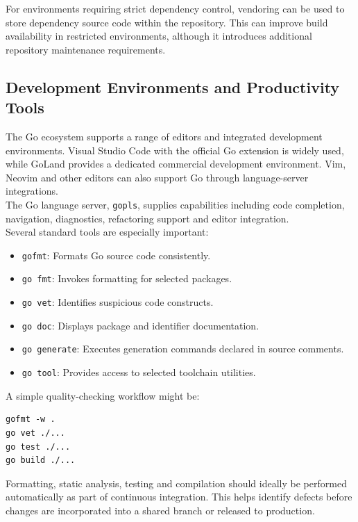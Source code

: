 For environments requiring strict dependency control, vendoring can be used to store dependency source code within the repository. This can improve build availability in restricted environments, although it introduces additional repository maintenance requirements.\\

\subsection{Development Environments and Productivity Tools}

The Go ecosystem supports a range of editors and integrated development environments. Visual Studio Code with the official Go extension is widely used, while GoLand provides a dedicated commercial development environment. Vim, Neovim and other editors can also support Go through language-server integrations.\\

The Go language server, \texttt{gopls}, supplies capabilities including code completion, navigation, diagnostics, refactoring support and editor integration.\\

Several standard tools are especially important:

\begin{itemize}
    \item \texttt{gofmt}: Formats Go source code consistently.
    \item \texttt{go fmt}: Invokes formatting for selected packages.
    \item \texttt{go vet}: Identifies suspicious code constructs.
    \item \texttt{go doc}: Displays package and identifier documentation.
    \item \texttt{go generate}: Executes generation commands declared in source comments.
    \item \texttt{go tool}: Provides access to selected toolchain utilities.
\end{itemize}

A simple quality-checking workflow might be:

\begin{lstlisting}
gofmt -w .
go vet ./...
go test ./...
go build ./...
\end{lstlisting}

Formatting, static analysis, testing and compilation should ideally be performed automatically as part of continuous integration. This helps identify defects before changes are incorporated into a shared branch or released to production.\\

